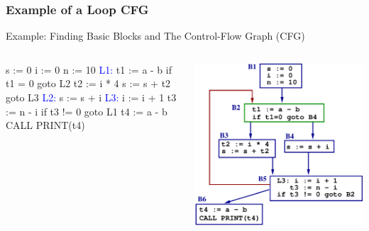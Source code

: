\documentclass{beamer}
\newcommand{\blue}[1]{\textcolor{Blue}{{#1}}}
\newcommand{\emp}[1]{\textcolor{DikuRed}{ #1}}
\begin{document}
\begin{frame}[fragile,t]
    \frametitle{Example of a Loop CFG}

\bigskip

\begin{block}{Example: Finding Basic Blocks and The Control-Flow Graph (CFG)}
\begin{columns}
\begin{colorcode}[fontsize=\scriptsize]
    s := 0
    i := 0
    n := 10
\blue{L1:}
    t1 := a - b
    if t1 = 0 \emp{goto L2}
    t2 := i * 4
    s := s + t2
    \emp{goto L3}
\blue{L2:} s := s + i
\blue{L3:} i := i + 1
    t3 := n - i
    if t3 != 0 \emp{goto L1}
    t4 := a - b
    CALL PRINT(t4)
\end{colorcode} 
\includegraphics[width=33ex]{Figures/LoopEg}
\end{columns}
\end{block}

\end{frame}
\end{document}

